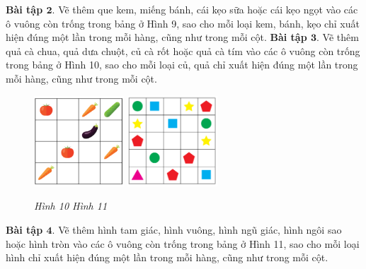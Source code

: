 	\textbf{Bài tập $\pmb{2.}$} Vẽ thêm que kem, miếng bánh, cái kẹo sữa hoặc cái kẹo ngọt vào các ô vuông còn trống trong bảng ở Hình 9, sao cho mỗi loại kem, bánh, kẹo chỉ xuất hiện đúng một lần trong mỗi hàng, cũng như trong mỗi cột.
	\vskip 0.1cm
	\textbf{Bài tập $\pmb{3.}$} Vẽ thêm quả cà chua, quả dưa chuột, củ cà rốt hoặc quả cà tím vào các ô vuông còn trống trong bảng ở Hình 10, sao cho mỗi loại củ, quả chỉ xuất hiện đúng một lần trong mỗi hàng, cũng như trong mỗi cột.
		\begin{figure}[H]
		\vspace*{-5pt}
		\centering
		\captionsetup{labelformat=empty, justification=centering}
		\includegraphics[width=0.3\textwidth]{hinh11}\hspace{40pt}
		\includegraphics[width=0.3\textwidth]{hinh13}
		
		\caption{\textit{\small Hình 10 \hspace*{75pt} Hình 11 }}  %
		\vspace*{-10pt}
	\end{figure}
	\textbf{Bài tập $\pmb{4.}$} Vẽ thêm  hình tam giác, hình vuông,  hình ngũ giác, hình ngôi sao hoặc hình tròn vào các ô vuông còn trống trong bảng ở Hình 11, sao cho mỗi loại hình chỉ xuất hiện đúng một lần trong mỗi hàng, cũng như trong mỗi cột.